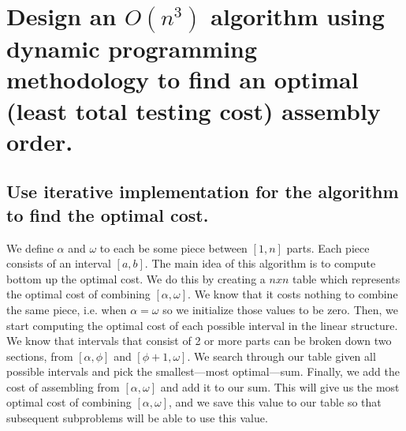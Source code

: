 \documentclass[11pt]{scrartcl}
\begin{document}
\section{Design an $O(n^3)$ algorithm using dynamic programming methodology to find an optimal
  (least total testing cost) assembly order.}
  
\subsection{
	Use iterative implementation for the algorithm to find the optimal cost.
}
We define $\alpha$ and $\omega$ to each be some piece between $[1,n]$ parts. Each piece consists of an interval $[a,b]$.
The main idea of this algorithm is to compute bottom up the optimal cost. We do this by creating a
$nxn$ table which represents the optimal cost of combining $[\alpha,\omega]$. We know that it costs
nothing to combine the same piece, i.e. when $\alpha = \omega$ so we initialize those values to be zero.
Then, we start computing the optimal cost of each possible interval in the linear structure. We know that intervals
that consist of 2 or more parts can be broken down two sections, from $[\alpha, \phi]$ and $[\phi+1,\omega]$. We search through our table given
all possible intervals and pick the smallest---most optimal---sum. Finally, we add the cost of assembling
from $[\alpha,\omega]$ and add it to our sum. This will give us the most optimal cost of combining
$[\alpha,\omega]$, and we save this value to our table so that subsequent subproblems will be able to
use this value.

\end{document}
